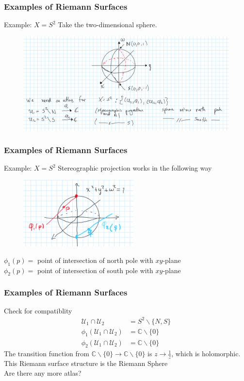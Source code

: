 \documentclass{beamer}[10]
\begin{document}
\begin{frame}
	\frametitle{Examples of Riemann Surfaces}
	\begin{block}{Example: $X=S^2$}
		Take the two-dimensional sphere.	
	\end{block}
	\begin{figure}\vspace*{-0.7cm}\hspace*{-0.7cm}
		\includegraphics[width=12cm]{7}
	\end{figure}
\end{frame}

\begin{frame}
	\frametitle{Examples of Riemann Surfaces}
	\begin{block}{Example: $X=S^2$}
	Stereographic projection works in the following way
	\end{block}
	\begin{figure}
		\includegraphics[width=6cm]{8}
	\end{figure}
	$\phi_1(p)=$ point of intersection of north pole with $xy$-plane\\
	$\phi_2(p)=$ point of intersection of south pole with $xy$-plane
\end{frame}

\begin{frame}
	\frametitle{Examples of Riemann Surfaces}
	\begin{block}{Check for compatiblity}
	\begin{equation}
		\begin{aligned}
			\mathcal{U}_{1}\cap \mathcal{U}_{2}&=S^2\backslash\{N,S\}\\
			\phi_1(\mathcal{U}_{1}\cap \mathcal{U}_{2})&=\mathds{C}\backslash\{0\}\\
			\phi_2(\mathcal{U}_{1}\cap \mathcal{U}_{2})&=\mathds{C}\backslash\{0\}
		\end{aligned}
	\end{equation}
	The transition function from $\mathds{C}\backslash\{0\}\to \mathds{C}\backslash\{0\}$ is $z\to \frac{1}{z}$, which is holomorphic. This Riemann surface structure is the Riemann Sphere\\
	Are there any more atlas?
	\end{block}
\end{frame}
\end{document}
